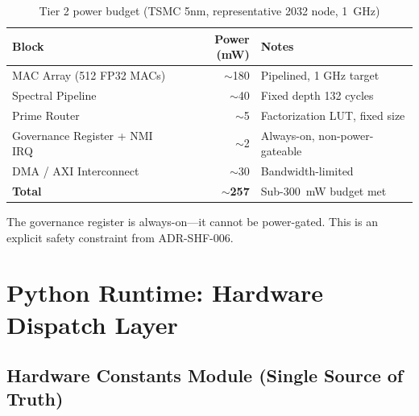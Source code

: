 \documentclass[12pt,letterpaper]{article}
\theoremstyle{plain}
\theoremstyle{definition}
\theoremstyle{remark}
\begin{document}
\begin{table}[H]
\centering
\caption{Tier 2 power budget (TSMC 5nm, representative 2032 node, 1~GHz)}
\label{tab:power}
\begin{tabular}{lrl}
\toprule
\textbf{Block} & \textbf{Power (mW)} & \textbf{Notes} \\
\midrule
MAC Array (512 FP32 MACs)    & $\sim$180 & Pipelined, 1 GHz target \\
Spectral Pipeline             & $\sim$40  & Fixed depth 132 cycles \\
Prime Router                  & $\sim$5   & Factorization LUT, fixed size \\
Governance Register + NMI IRQ & $\sim$2   & Always-on, non-power-gateable \\
DMA / AXI Interconnect        & $\sim$30  & Bandwidth-limited \\
\midrule
\textbf{Total}               & $\sim$\textbf{257} & Sub-300~mW budget met \\
\bottomrule
\end{tabular}
\end{table}

The governance register is always-on---it cannot be power-gated. This is an
explicit safety constraint from ADR-SHF-006.

\section{Python Runtime: Hardware Dispatch Layer}

\subsection{Hardware Constants Module (Single Source of Truth)}
\end{document}

